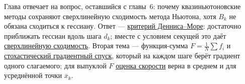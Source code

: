 Глава отвечает на вопрос, оставшийся с главы~6: почему квазиньютоновские методы сохраняют сверхлинейную сходимость метода Ньютона, хотя $B_k$ не обязана сходиться к гессиану. Ответ --- \hyperref[note:D65FB534-B7F1-4194-8E4B-D4ACAA89E6D2]{критерий Денниса--Море}: достаточно приближать гессиан вдоль шага $d_k$; вместе с условием секущей это даёт \hyperref[note:A9E5C7FA-46FE-460E-A1B9-5B7CD72DB5B4]{сверхлинейную сходимость}. Вторая тема --- функция-сумма $F = \frac{1}{N}\sum f_i$ и \hyperref[note:A4769F74-2E6F-4CA3-89E4-7B01881D8109]{стохастический градиентный спуск}, который на каждом шаге берёт градиент одного слагаемого; для выпуклой $F$ \hyperref[note:58D1735C-5A70-4DA0-B522-B4595CB4494C]{оценка скорости} верна в среднем и для усреднённой точки $\overline{x}_k$.
